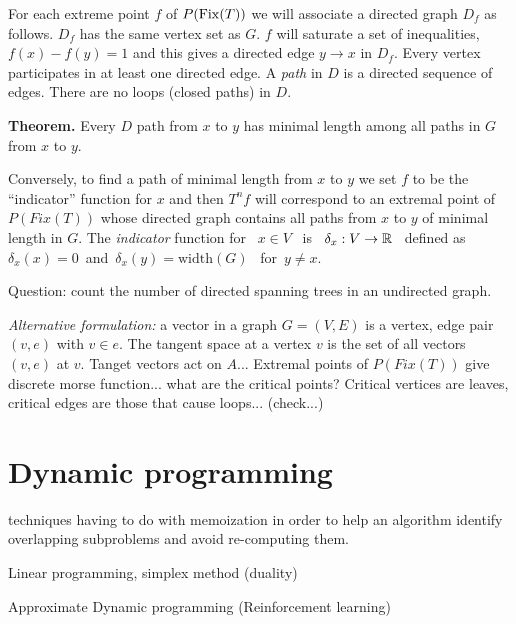 \documentclass[11pt]{article}
\begin{document}
For each extreme point $f$ of $P(\mathrm{Fix}(T))$ 
we will associate a directed graph $D_f$
as follows.
$D_f$ has the same vertex set as $G$.
$f$ will saturate a set of inequalities,
$f(x)-f(y)=1$
and this gives a directed edge $y\to x$ in $D_f.$
Every vertex participates in at least one
directed edge.
A \emph{path} in $D$ is a directed sequence of edges.
There are no loops (closed paths) in $D$.

{\bf Theorem.} Every $D$ path from $x$ to $y$ has
minimal length among all paths in $G$ from $x$ to $y.$

Conversely, to find a path of minimal length 
from $x$ to $y$ we set $f$ to be the ``indicator''
function for $x$ and then $T^nf$ will correspond
to an extremal point of $P(Fix(T))$ whose directed
graph contains all paths from $x$ to $y$ of minimal length in $G.$
The \emph{indicator} function for \ $x\in V$ \ is \ $\delta_x:V\to \mathbb R$ 
\ defined as\ $\delta_x(x)=0$\ and\ $\delta_x(y)=\mathrm{width}(G)$
\ for\ $y\ne x.$

Question: count the number of directed spanning trees in an undirected graph.

\emph{Alternative formulation:}
a vector in a graph $G=(V,E)$ is a vertex, edge pair $(v,e)$ with $v\in e.$
The tangent space at a vertex $v$ is the set of all vectors $(v,e)$
at $v$.
Tanget vectors act on $A$...
Extremal points of $P(Fix(T))$ give discrete morse function...
what are the critical points?
Critical vertices are leaves, critical edges are those that cause loops... (check...)



%
%

\section{Dynamic programming}

techniques having to do with memoization 
in order to help an algorithm identify overlapping subproblems and avoid re-computing them.

Linear programming, simplex method (duality)

Approximate Dynamic programming (Reinforcement learning)
\end{document}
